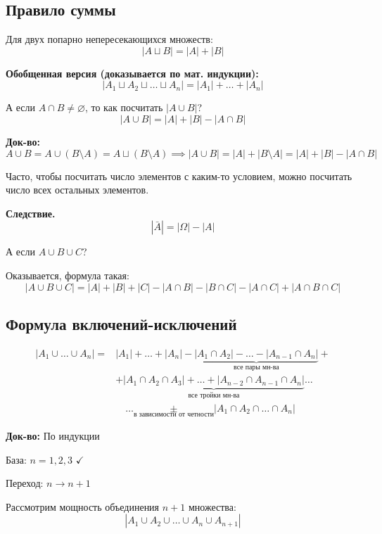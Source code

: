 \documentclass[10pt, a4paper]{article}
\begin{document}
\subsection*{Правило суммы}

Для двух попарно непересекающихся множеств:
$$|A \sqcup B| = |A| + |B|$$

\textbf{Обобщенная версия (доказывается по мат. индукции):}
$$|A_1 \sqcup A_2 \sqcup \dots \sqcup A_n| = |A_1| + \dots + |A_n|$$


\vspace{0.3cm}
\noindent А если $A \cap B \neq \varnothing$, то как посчитать $|A \cup B|$?
$$|A \cup B| = |A| + |B| - |A \cap B|$$

\textbf{Док-во:}
$$A \cup B = A \cup (B \setminus A) = A \sqcup (B \setminus A) \implies |A \cup B| = |A| + |B \setminus A| = |A| + |B| - |A \cap B|$$

\noindent Часто, чтобы посчитать число элементов с каким-то условием, можно посчитать число всех остальных элементов. 

\textbf{Следствие.}
$$|\bar A| = |\Omega| - |A|$$



А если $A \cup B \cup C$? 

\vspace{0.2 cm}
Оказывается, формула такая:
$$|A \cup B \cup C| = |A| + |B| + |C| - |A \cap B| - |B \cap C| - |A \cap C| + |A \cap B \cap C|$$

\subsection*{Формула включений-исключений}

\[
\begin{aligned}
|A_1 \cup \dots \cup A_n|
={}& |A_1| + \dots + |A_n| - \underbrace{|A_1 \cap A_2| - \dots - |A_{n-1} \cap A_n|} _{\text{все пары мн-ва}} + \\
& + \underbrace{|A_1 \cap A_2 \cap A_3| + \dots + |A_{n-2} \cap A_{n-1} \cap A_n|} _{\text{все тройки мн-ва}} \dots \\
& \quad \dots \underset{\text{в зависимости от четности}}{\pm} |A_1 \cap A_2 \cap \dots \cap A_n|
\end{aligned}
\]

\textbf{Док-во:} По индукции

База: $n = 1, 2, 3$ $\checkmark$

Переход: $n \to n+1$

Рассмотрим мощность объединения $n+1$ множества:
$$|A_1 \cup A_2 \cup \dots \cup A_n \cup A_{n+1}|$$
\end{document}
